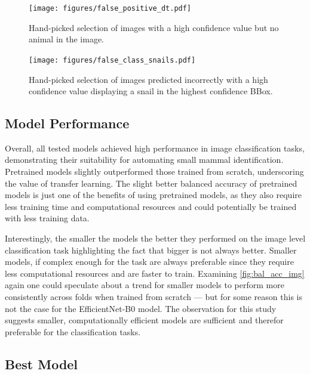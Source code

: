 \begin{figure}[]
\centering
\texttt{[image: figures/false\_positive\_dt.pdf]}
\caption{Hand-picked selection of images with a high confidence value but no animal in the image.}
\label{fig:false_positive_dt}
\end{figure}

\begin{figure}[]
\centering
\texttt{[image: figures/false\_class\_snails.pdf]}
\caption{Hand-picked selection of images predicted incorrectly with a high confidence value displaying a snail in the highest confidence BBox.}
\label{fig:false_class_snails}
\end{figure}

\subsection{Model Performance}
Overall, all tested models achieved high performance in image classification tasks, demonstrating their suitability for automating small mammal identification.
Pretrained models slightly outperformed those trained from scratch, underscoring the value of transfer learning.
The slight better balanced accuracy of pretrained models is just one of the benefits of using pretrained models, as they also require less training time and computational resources and could potentially be trained with less training data.

Interestingly, the smaller the models the better they performed on the image level classification task highlighting the fact that bigger is not always better.
Smaller models, if complex enough for the task are always preferable since they require less computational resources and are faster to train.
Examining \autoref{fig:bal_acc_img} again one could speculate about a trend for smaller models to perform more consistently across folds when trained from scratch --- but for some reason this is not the case for the EfficientNet-B0 model.
The observation for this study suggests smaller, computationally efficient models are sufficient and therefor preferable for the classification tasks.

\subsection{Best Model}

